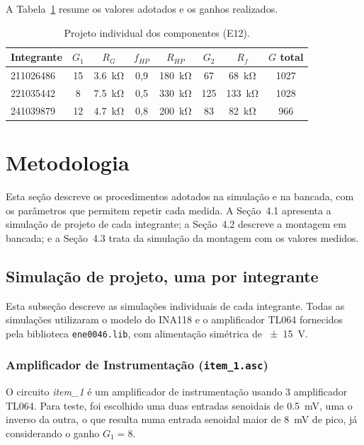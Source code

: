 \documentclass[11pt,a4paper]{article}
\begin{document}
A Tabela~\ref{tab:projeto_individual} resume os valores adotados e os ganhos realizados.

\begin{table}[h]
\centering
\caption{Projeto individual dos componentes (E12).}
\label{tab:projeto_individual}
\begin{tabular}{lccccccc}
\hline
Integrante & $G_1$ & $R_G$ & $f_{HP}$ & $R_{HP}$ & $G_2$ & $R_f$ & $G$ total \\
\hline
211026486 & 15 & \SI{3,6}{\kilo\ohm} & 0,9 & \SI{180}{\kilo\ohm} & 67 & \SI{68}{\kilo\ohm} & 1027 \\
221035442 & 8 & \SI{7,5}{\kilo\ohm} & 0,5 & \SI{330}{\kilo\ohm} & 125 & \SI{133}{\kilo\ohm} & 1028 \\
241039879 & 12 & \SI{4,7}{\kilo\ohm} & 0,8 & \SI{200}{\kilo\ohm} & 83 & \SI{82}{\kilo\ohm} & 966 \\
\hline
\end{tabular}
\end{table}

\section{Metodologia}

Esta seção descreve os procedimentos adotados na simulação e na bancada, com os parâmetros que permitem repetir cada medida. A Seção~4.1 apresenta a simulação de projeto de cada integrante; a Seção~4.2 descreve a montagem em bancada; e a Seção~4.3 trata da simulação da montagem com os valores medidos.

\subsection{Simulação de projeto, uma por integrante}

Esta subseção descreve as simulações individuais de cada integrante. Todas as simulações utilizaram o modelo do INA118 e o amplificador TL064 fornecidos pela biblioteca \texttt{ene0046.lib}, com alimentação simétrica de \SI{\pm 15}{\volt}.

\subsubsection{Amplificador de Instrumentação (\texttt{item\_1.asc})}

O circuito \textit{item\_1} é um amplificador de instrumentação usando 3 amplificador TL064. Para teste,
foi escolhido uma duas entradas senoidais de \SI{0.5}{\milli\volt}, uma o inverso da outra, o que resulta numa
entrada senoidal maior de \SI{8}{\milli\volt} de pico, já considerando o ganho $G_1 = 8$.
\end{document}

